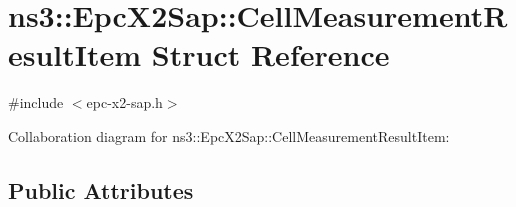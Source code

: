 \hypertarget{structns3_1_1EpcX2Sap_1_1CellMeasurementResultItem}{}\section{ns3\+:\+:Epc\+X2\+Sap\+:\+:Cell\+Measurement\+Result\+Item Struct Reference}
\label{structns3_1_1EpcX2Sap_1_1CellMeasurementResultItem}


{\ttfamily \#include $<$epc-\/x2-\/sap.\+h$>$}



Collaboration diagram for ns3\+:\+:Epc\+X2\+Sap\+:\+:Cell\+Measurement\+Result\+Item\+:
\subsection*{Public Attributes}
